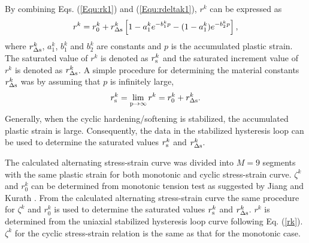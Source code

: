 \documentclass[preprint,5p,twocolumn,11pt,sort&compress]{elsarticle}
\begin{document}
By combining Eqs. (\ref{Equ:rk1}) and (\ref{Equ:rdeltak1}), $r^k$ can be expressed as
\begin{equation}\label{rk}
{r^k} = r_0^k + r_{\Delta \rm s}^k\left[ {1 - a_1^k{e^{ - b_1^kp}} - (1-a_1^k){e^{ - b_2^kp}} }\right],
\end{equation}
where $r_{\Delta \rm s}^k$, $a_1^k$, $b_1^k$ and $b_2^k$ are constants and $p$ is the accumulated plastic strain.
The saturated value of $r^k$ is denoted as $r^k_{\rm s}$ and the saturated increment value of $r^k$ is denoted as $r^k_{\Delta \rm s}$.
A simple procedure for determining the material constants $r_{\Delta \rm s}^k$ was by assuming that $p$ is infinitely large,
\begin{equation}
r_{\rm s}^k=\mathop {\lim }\limits_{{\rm{p}} \to \infty } {r^k} = r_0^k + r_{\Delta \rm s}^k.
\label{Equ:rsk}
\end{equation}
Generally, when the cyclic hardening/softening is stabilized, the accumulated plastic strain is large.
Consequently, the data in the stabilized hysteresis loop can be used to determine the saturated values $r^k_{\rm s}$ and $r^k_{\Delta \rm s}$.

The calculated alternating stress-strain curve was divided into $M=9$ segments with the same plastic strain for both monotonic and cyclic stress-strain curve.  $\zeta^k$ and $r_0^k$ can be determined from monotonic tension test as suggested by Jiang and Kurath \cite{Jiang1996387}. From the calculated alternating stress-strain curve the same procedure for $\zeta^k$ and $r_0^k$ is used to determine the saturated values $r^k_{\rm s}$ and $r^k_{\Delta \rm s}$.  $r^k$ is determined from the uniaxial stabilized hysteresis loop curve following Eq. (\ref{rk}). ${\zeta ^k}$ for the cyclic stress-strain relation is the same as that for the monotonic case.

\end{document}
